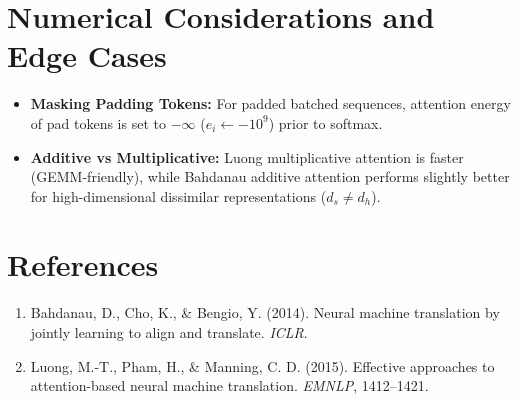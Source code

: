 \documentclass[11pt,a4paper]{article}
\theoremstyle{definition}
\begin{document}
\section{Numerical Considerations and Edge Cases}

\begin{itemize}
    \item \textbf{Masking Padding Tokens:} For padded batched sequences, attention energy of pad tokens is set to $-\infty$ ($e_i \gets -10^9$) prior to softmax.
    \item \textbf{Additive vs Multiplicative:} Luong multiplicative attention is faster (GEMM-friendly), while Bahdanau additive attention performs slightly better for high-dimensional dissimilar representations ($d_s \ne d_h$).
\end{itemize}

\section{References}
\begin{enumerate}
    \item Bahdanau, D., Cho, K., \& Bengio, Y. (2014). Neural machine translation by jointly learning to align and translate. \emph{ICLR}.
    \item Luong, M.-T., Pham, H., \& Manning, C. D. (2015). Effective approaches to attention-based neural machine translation. \emph{EMNLP}, 1412--1421.
\end{enumerate}
\end{document}
